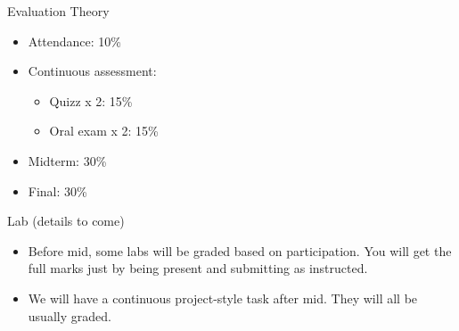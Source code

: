\begin{frame}{Evaluation}
    Theory
    \begin{itemize}
        \item Attendance: 10\%
        \item Continuous assessment:
            \begin{itemize}
                \item Quizz x 2: 15\%
                \item Oral exam x 2: 15\%
            \end{itemize}
        \item Midterm: 30\%
        \item Final: 30\%
    \end{itemize}

    Lab (details to come)
    \begin{itemize}
        \item Before mid, some labs will be graded based on participation. You will get the full marks just by being present and submitting as instructed.
        \item We will have a continuous project-style task after mid. They will all be usually graded.
    \end{itemize}
\end{frame}